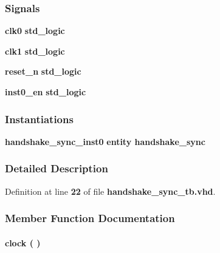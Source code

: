 \subsubsection*{Signals}
 \begin{DoxyCompactItemize}
\item 
{\bf clk0} {\bfseries \textcolor{comment}{std\+\_\+logic}\textcolor{vhdlchar}{ }} 
\item 
{\bf clk1} {\bfseries \textcolor{comment}{std\+\_\+logic}\textcolor{vhdlchar}{ }} 
\item 
{\bf reset\+\_\+n} {\bfseries \textcolor{comment}{std\+\_\+logic}\textcolor{vhdlchar}{ }} 
\item 
{\bf inst0\+\_\+en} {\bfseries \textcolor{comment}{std\+\_\+logic}\textcolor{vhdlchar}{ }} 
\end{DoxyCompactItemize}
\subsubsection*{Instantiations}
 \begin{DoxyCompactItemize}
\item 
{\bf handshake\+\_\+sync\+\_\+inst0}  {\bfseries entity handshake\+\_\+sync}   
\end{DoxyCompactItemize}


\subsubsection{Detailed Description}


Definition at line {\bf 22} of file {\bf handshake\+\_\+sync\+\_\+tb.\+vhd}.



\subsubsection{Member Function Documentation}
\paragraph[{clock}]{\setlength{\rightskip}{0pt plus 5cm} {\bfseries \textcolor{vhdlchar}{ }} clock ( ) \hspace{0.3cm}{\ttfamily [Process]}}\label{classhandshake__sync__tb_1_1tb__behave_af761a67e9d7ce9e23381088b6f2ae893}


